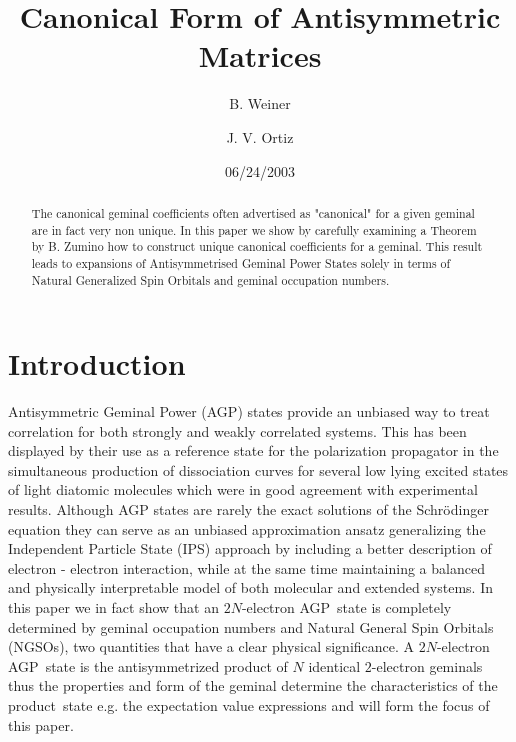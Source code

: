 \documentclass[aps,preprint]{revtex4}%
\begin{document}
\preprint{ }
\title[Antisym. Mat]{Canonical Form of Antisymmetric Matrices}
\author{B. Weiner}
\author{J. V. Ortiz}

\pacs{}

\begin{abstract}
The canonical geminal coefficients often advertised as "canonical" for a given
geminal are in fact very non unique. In this paper we show by carefully
examining a Theorem by B. Zumino how to construct unique canonical
coefficients for a geminal. This result leads to expansions of Antisymmetrised
Geminal Power States solely in terms of Natural Generalized Spin Orbitals and
geminal occupation numbers.

\end{abstract}
\date{06/24/2003}
\maketitle
\tableofcontents


\section{Introduction\label{intro}}

Antisymmetric Geminal Power (AGP) states provide an unbiased way to treat
correlation for both strongly and weakly correlated systems. This has been
displayed by their use as a reference state for the polarization propagator
\cite{weiner87}\cite{Weiner85}\cite{Weiner84a}\cite{Kurtz83}\cite{Jorgen83} in
the simultaneous production of dissociation curves for several low lying
excited states of light diatomic molecules which were in good agreement with
experimental results. Although AGP states are rarely the exact solutions of
the Schr\"{o}dinger equation they can serve as an unbiased approximation
ansatz generalizing the Independent Particle State (IPS) approach by including
a better description of electron - electron interaction, while at the same
time maintaining a balanced and physically interpretable model of both
molecular and extended systems. In this paper we in fact show that an
$2N$-electron AGP\ state is completely determined by geminal occupation
numbers and Natural General Spin Orbitals (NGSOs), two quantities that have a
clear physical significance. A $2N$-electron AGP\ state is the antisymmetrized
product of $N$ identical $2$-electron geminals thus the properties and form of
the geminal determine the characteristics of the product\ state e.g. the
expectation value expressions and will form the focus of this paper.
\end{document}
